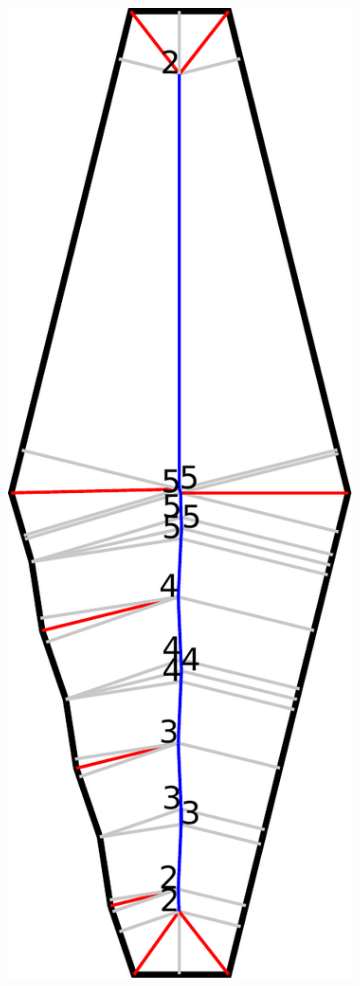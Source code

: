 \begin{figure}
\centering
\setlength{\figwidth}{0.15\textwidth}
\begin{subfigure}{\figwidth}
\includegraphics[width=\columnwidth]{sources/method/beading_transitioning_filtering__bead_count.pdf}

\end{subfigure}
\end{figure}

